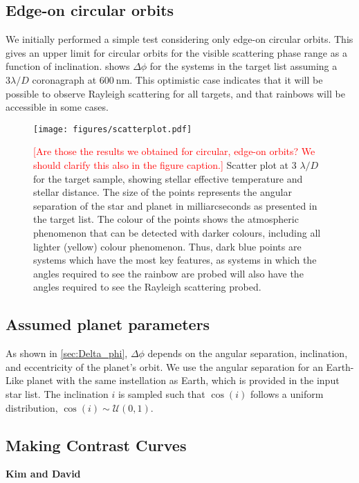 \documentclass[
    usenatbib,
]{mnras}
\newcommand{\todo}[1]{\textcolor{red}{[#1]}}
\begin{document}
\subsection{Edge-on circular orbits}
\label{sec:edge-on}
We initially performed a simple test considering only edge-on circular orbits. 
This gives an upper limit for circular orbits for the visible scattering phase range as a function of inclination. 
 shows $\Delta \phi$ for the systems in the target list assuming a $3 \lambda / D$ coronagraph at $\SI{600}{\nano\meter}$. 
This optimistic case indicates that it will be possible to observe Rayleigh scattering for all targets, and that rainbows will be accessible in some cases.

\begin{figure*}
    \centering
    \texttt{[image: figures/scatterplot.pdf]}
    \caption{
        \todo{Are those the results we obtained for circular, edge-on orbits? 
        We should clarify this also in the figure caption.}
        Scatter plot at 3 $\lambda/D$ for the target sample, showing stellar effective temperature and stellar distance. 
        The size of the points represents the angular separation of the star and planet in milliarcseconds as presented in the target list. 
        The colour of the points shows the atmospheric phenomenon that can be detected with darker colours, including all lighter (yellow) colour phenomenon. 
        Thus, dark blue points are systems which have the most key features, as systems in which the angles required to see the rainbow are probed will also have the angles required to see the Rayleigh scattering probed.
    }
    \label{fig:scatterplot}
\end{figure*}

\subsection{Assumed planet parameters}

As shown in \cref{sec:Delta_phi}, $\Delta \phi$ depends on the angular separation, inclination, and eccentricity of the planet's orbit. 
We use the angular separation for an Earth-Like planet with the same instellation as Earth, which is provided in the input star list. 
The inclination $i$ is sampled such that $\cos(i)$ follows a uniform distribution, $\cos(i) \sim \mathcal{U}(0, 1)$.

\subsection{Making Contrast Curves}
\textbf{Kim and David}
%
\end{document}
